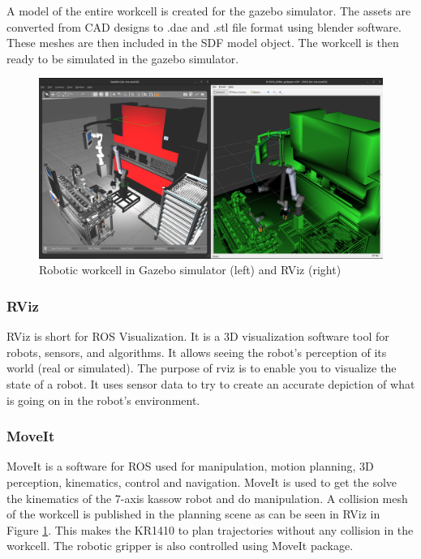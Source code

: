 A model of the entire workcell is created for the gazebo simulator. The assets are converted from CAD designs
to .dae and .stl file format using blender software. These meshes are then included in the SDF model object.
The workcell is then ready to be simulated in the gazebo simulator.

\begin{figure}[h]
    \centering
    \includegraphics[width=\textwidth]{figures/gazebo-rviz.png}
    \caption{Robotic workcell in Gazebo simulator (left) and RViz (right)}
    \label{fig:gazebo-rviz}
\end{figure}

\subsubsection{RViz}
\label{subsubsec:RViz}
RViz is short for ROS Visualization. It is a 3D visualization software tool for robots, sensors, and algorithms.
It allows seeing the robot's perception of its world (real or simulated).
The purpose of rviz is to enable you to visualize the state of a robot. It uses sensor data to try
to create an accurate depiction of what is going on in the robot's environment. \cite{rviz}

\subsubsection{MoveIt}
\label{subsubsec:moveit}
MoveIt is a software for ROS used for manipulation, motion planning, 3D perception, kinematics, control and navigation. \cite{moveit}
MoveIt is used to get the solve the kinematics of the 7-axis kassow robot and do manipulation.
A collision mesh of the workcell is published in the planning scene as can be seen in RViz in Figure \ref{fig:gazebo-rviz}.
This makes the KR1410 to plan trajectories without any collision in the workcell. The robotic gripper is also controlled using MoveIt package.
